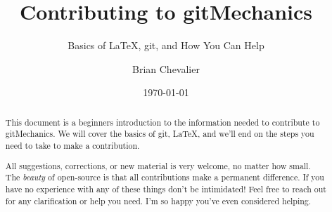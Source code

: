 \documentclass[landscape, twocolumn, 12pt]{article}
\title{Contributing to gitMechanics}
\subtitle{Basics of \LaTeX{}, git, and How You Can Help}
\author{Brian Chevalier}
\date{\today}
\begin{document}
\maketitle

\renewcommand{\abstractname}{Welcome to the gitMechanics Team!}

\begin{abstract}
This document is a beginners introduction to the information needed to contribute to gitMechanics. We will cover the basics of git, \LaTeX{}, and we'll end on the steps you need to take to make a contribution.

All suggestions, corrections, or new material is very welcome, no matter how small. The \textit{beauty} of open-source is that all contributions make a permanent difference. If you have no experience with any of these things don't be intimidated! Feel free to reach out for any clarification or help you need. I'm so happy you've even considered helping.
\end{abstract}






\begin{appendices}
	
	
	\clearpage
\end{appendices}





%
%
\end{document}
